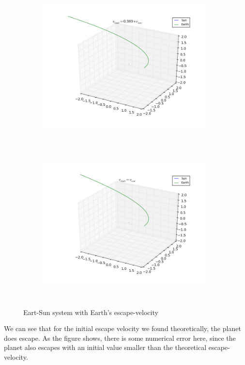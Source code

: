 \documentclass[%
 reprint,
 nobalance,
 amsmath,amssymb,
 aps,
]{revtex4-1}
\begin{document}
 \begin{figure}[H]	%
     \centering
     \begin{subfigure}{0.5\textwidth}
         \centering
         \includegraphics[height=3.2in, width=0.99\textwidth]{plot/0989vEsc.png}
         \caption{}
     \end{subfigure}
     \begin{subfigure}{0.5\textwidth}
         \centering
         \includegraphics[height=3.2in, width=0.99\textwidth]{plot/vEsc.png}
         \caption{}
     \end{subfigure} 
     \caption{Eart-Sun system with Earth's escape-velocity}\label{fig:esc_vel}
 \end{figure}
 
 We can see that for the initial escape velocity we found theoretically, the planet does escape.
As the figure shows, there is some numerical error here, since the planet also escapes with an initial value smaller than the theoretical escape-velocity.  
  
\end{document}
